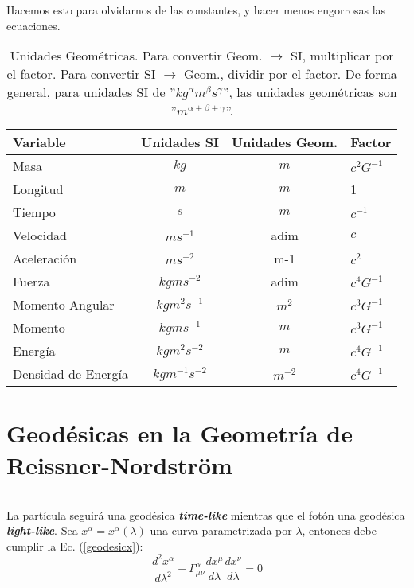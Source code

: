 Hacemos esto para olvidarnos de las constantes, y hacer menos engorrosas las ecuaciones.
\begin{table}[h]
  \begin{center}
    \begin{tabular}{lccl}
      \toprule
      Variable & Unidades SI & Unidades Geom. & Factor \\
      \midrule
      Masa & $kg$ & $m$ &$c^2 G^{-1}$ \\
      Longitud & $m$ & $m$ & 1 \\
      Tiempo & $s$ & $m$ & $c^{-1}$\\
      Velocidad & $m s^{-1}$ & adim & $c$  \\
      Aceleración & $m s^{-2}$ & m{-1} & $c^2$  \\
      Fuerza & $kg m s^{-2}$ & adim & $c^4 G^{-1}$  \\
      Momento Angular & $kg m^2 s^{-1}$ & $m^2$ & $c^3 G^{-1}$ \\
      Momento & $kg m s^{-1}$ & $m$ & $c^3 G^{-1}$ \\
      Energía & $kg m^2 s^{-2}$ & $m$ & $c^{4} G^{-1}$\\
      Densidad de Energía & $kg m^{-1} s^{-2}$ & $m^{-2}$ & $c^4 G^{-1}$  \\
      \bottomrule
    \end{tabular}
  \end{center}
  \caption{Unidades Geométricas. Para convertir Geom. $\rightarrow$ SI, multiplicar por el factor. Para convertir SI $\rightarrow$ Geom., dividir por el factor. De forma general, para unidades SI de ''$kg^\alpha m^\beta s^\gamma$'', las unidades geométricas son ''$m^{\alpha + \beta + \gamma}$''.}
  \label{geounits}
\end{table}
\section{\huge{Geodésicas en la Geometría de Reissner-Nordström}}

\textcolor{myred}{\hrule}

 La partícula seguirá una geodésica \textbf{\textit{time-like}} mientras que el fotón una geodésica \textbf{\textit{light-like}}. Sea $x^\alpha = x^\alpha (\lambda)$ una curva parametrizada por $\lambda$, entonces debe cumplir la Ec. (\ref{geodesicx}):
\begin{equation}
    \frac{d^2 x^\alpha}{d \lambda^2} + \Gamma^\alpha_{\mu\nu} \frac{d x^\mu}{d \lambda} \frac{d x^\nu}{d \lambda} = 0
\end{equation}

